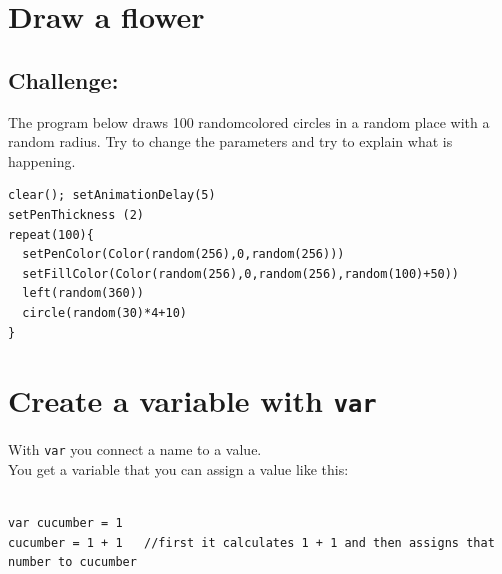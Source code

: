 \chapter{Draw a flower}\section*{\color{BrickRed}Challenge:}
The program below draws 100 randomcolored circles in a random place with a random radius. Try to change the parameters and try to explain what is happening.

  

\begin{lstlisting}[basicstyle={\ttfamily\fontsize{16}{19}\selectfont},numbers=none]
clear(); setAnimationDelay(5)
setPenThickness (2)
repeat(100){
  setPenColor(Color(random(256),0,random(256)))
  setFillColor(Color(random(256),0,random(256),random(100)+50))
  left(random(360))
  circle(random(30)*4+10)
}
\end{lstlisting}
        
\chapter{Create a variable with \lstinline{var}}With \lstinline{var} you connect a name to a value.\\
You get a variable that you can assign a value like this:

\begin{lstlisting}[numbers=none]

var cucumber = 1
cucumber = 1 + 1   //first it calculates 1 + 1 and then assigns that number to cucumber     
        
\end{lstlisting}
        
